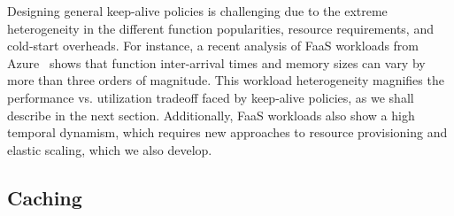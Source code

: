 Designing general keep-alive policies is challenging due to the extreme heterogeneity in the different function popularities, resource requirements, and cold-start overheads.
For instance, a recent analysis of FaaS workloads from Azure~\cite{shahrad_serverless_2020} shows that function inter-arrival times and memory sizes can vary by more than three orders of magnitude. 
%
This workload heterogeneity magnifies the performance vs. utilization tradeoff faced by keep-alive policies, as we shall describe in the next section. 
Additionally, FaaS workloads also show a high temporal dynamism, which requires new approaches to resource provisioning and elastic scaling, which we also develop. 








\subsection{Caching}
\vspace*{\subsecspace}


